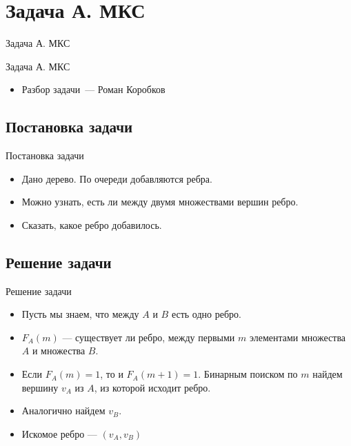 \section{Задача А. МКС}

\begin{frame}[t]{Задача А. МКС}

  \vspace{2cm}
  \begin{center}
    \LARGE Задача А. МКС
  \end{center}
\end{frame}


\begin{frame}[t]{}
  \vspace{3cm}

  \begin{itemize}
    \item Разбор задачи~--- Роман Коробков
  \end{itemize}
\end{frame}



\subsection{Постановка задачи}

\begin{frame}[t]{Постановка задачи}
\begin{itemize}
    \item Дано дерево. По очереди добавляются ребра.
    \item Можно узнать, есть ли между двумя множествами вершин ребро. 
    \item Сказать, какое ребро добавилось.
\end{itemize}
\end{frame}

\subsection{Решение задачи}

\begin{frame}[t]{Решение задачи}
\begin{itemize}
	\item Пусть мы знаем, что между $A$ и $B$  есть одно ребро.
	\item $F_{A}(m)$ --- существует ли ребро, между первыми $m$ элементами множества $A$ и множества $B$.
	\item Если $F_{A}(m) = 1$, то и $F_{A}(m + 1) = 1$. Бинарным поиском по $m$ найдем вершину $v_{A}$ из $A$, из которой исходит ребро.
	\item Аналогично найдем $v_{B}$. 
	\item Искомое ребро --- $(v_{A}, v_{B})$
\end{itemize}
\end{frame}


